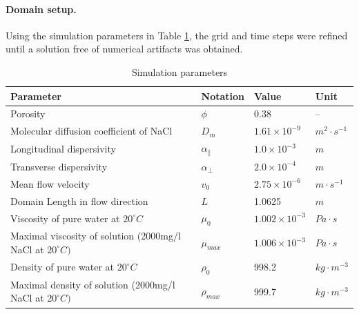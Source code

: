 \paragraph*{Domain setup.} Using the simulation parameters in Table \ref{tab:simu}, the grid and time steps were refined until a solution free of numerical artifacts was obtained.
\begin{table}[!h]
{\footnotesize
\begin{center}
\caption{\label{tab:simu}Simulation parameters}
\begin{tabular}{|l|l|l|l|}\hline
{\bf Parameter}                                 &{\bf Notation}     &{\bf Value}            &{\bf Unit} \\\hline\hline
Porosity                    &$\phi$          &$0.38$             &--     \\
Molecular diffusion coefficient of NaCl     &$D_m$          &$1.61\times 10^{-9}$   &$m^2\cdot s^{-1}$  \\
Longitudinal dispersivity           &$\alpha_{\parallel}$     &$1.0\times 10^{-3}$        &$m$        \\
Transverse dispersivity             &$\alpha_{\perp}$      &$2.0\times 10^{-4}$      &$m$        \\
Mean flow velocity             &$v_{0}$      &$2.75\times 10^{-6}$      &$m\cdot s^{-1}$        \\
Domain Length in flow direction                 &$L$                    &1.0625                         &$m$\\
Viscosity of pure water at $20^{\circ}C$      &$\mu_0$        &$1.002\times 10^{-3}$      &$Pa\cdot s$        \\
Maximal viscosity of solution (2000mg/l NaCl at $20^{\circ}C)$  &$\mu_{max}$  &$1.006\times 10^{-3}$      &$Pa\cdot s$        \\            
Density of pure water at $20^{\circ}C$        &$\rho_0$       &998.2          &$kg\cdot m^{-3}$   \\
Maximal density of solution (2000mg/l NaCl at $20^{\circ}C)$                  &$\rho_{max}$       &999.7          &$kg\cdot m^{-3}$   \\

\end{tabular}
\end{center}}
\end{table}

